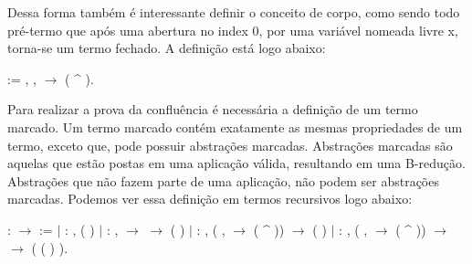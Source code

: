  Dessa forma também é interessante definir o conceito de corpo, como sendo todo pré-termo
que após uma abertura no index 0, por uma variável nomeada livre x, torna-se um termo fechado.
A definição está logo abaixo:\begin{coqdoccode}
\coqdocemptyline
\coqdocnoindent
{}   :=\coqdoceol
\coqdocindent{1.00em}
\coqdoctac{\ensuremath{\exists}} , \coqdockw{\ensuremath{\forall}} ,    \ensuremath{\rightarrow}  ( \^{} ).\coqdoceol
\coqdocemptyline
\coqdocemptyline
\end{coqdoccode}
Para realizar a prova da confluência é necessária a definição de um termo marcado. Um
termo marcado contém exatamente as mesmas propriedades de um termo, exceto que, pode possuir
abstrações marcadas. Abstrações marcadas são aquelas que estão postas em uma aplicação válida,
resultando em uma B-redução. Abstrações que não fazem parte de uma aplicação, não podem ser 
abstrações marcadas. Podemos ver essa definição em termos recursivos logo abaixo:\begin{coqdoccode}
\coqdocemptyline
\coqdocnoindent
{}  :  \ensuremath{\rightarrow}  :=\coqdoceol
\coqdocindent{1.00em}
\ensuremath{|}  : \coqdockw{\ensuremath{\forall}} ,\coqdoceol
\coqdocindent{3.00em}
 ( )\coqdoceol
\coqdocindent{1.00em}
\ensuremath{|}  : \coqdockw{\ensuremath{\forall}}  ,\coqdoceol
\coqdocindent{3.00em}
  \ensuremath{\rightarrow} \coqdoceol
\coqdocindent{3.00em}
  \ensuremath{\rightarrow} \coqdoceol
\coqdocindent{3.00em}
 (  )\coqdoceol
\coqdocindent{1.00em}
\ensuremath{|}  : \coqdockw{\ensuremath{\forall}}  ,\coqdoceol
\coqdocindent{3.00em}
(\coqdockw{\ensuremath{\forall}} ,    \ensuremath{\rightarrow}  ( \^{} )) \ensuremath{\rightarrow}\coqdoceol
\coqdocindent{3.00em}
 ( )\coqdoceol
\coqdocindent{1.00em}
\ensuremath{|}  : \coqdockw{\ensuremath{\forall}}   ,\coqdoceol
\coqdocindent{3.00em}
(\coqdockw{\ensuremath{\forall}} ,    \ensuremath{\rightarrow}  ( \^{} )) \ensuremath{\rightarrow}\coqdoceol
\coqdocindent{3.00em}
  \ensuremath{\rightarrow}\coqdoceol
\coqdocindent{3.00em}
 ( ( ) ).\coqdoceol
\coqdocemptyline
\end{coqdoccode}
